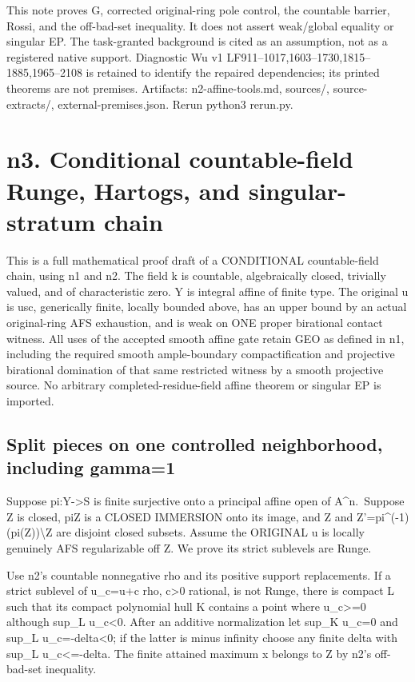 \documentclass[
  10pt,
]{article}
\begin{document}
This note proves G, corrected original-ring pole control, the countable
barrier, Rossi, and the off-bad-set inequality. It does not assert
weak/global equality or singular EP. The task-granted background is
cited as an assumption, not as a registered native support. Diagnostic
Wu v1 LF911--1017,1603--1730,1815--1885,1965--2108 is retained to
identify the repaired dependencies; its printed theorems are not
premises. Artifacts: n2-affine-tools.md, sources/, source-extracts/,
external-premises.json. Rerun python3 rerun.py.

\section{n3. Conditional countable-field Runge, Hartogs, and
singular-stratum
chain}\label{n3.-conditional-countable-field-runge-hartogs-and-singular-stratum-chain}

This is a full mathematical proof draft of a CONDITIONAL countable-field
chain, using n1 and n2. The field k is countable, algebraically closed,
trivially valued, and of characteristic zero. Y is integral affine of
finite type. The original u is usc, generically finite, locally bounded
above, has an upper bound by an actual original-ring AFS exhaustion, and
is weak on ONE proper birational contact witness. All uses of the
accepted smooth affine gate retain GEO as defined in n1, including the
required smooth ample-boundary compactification and projective
birational domination of that same restricted witness by a smooth
projective source. No arbitrary completed-residue-field affine theorem
or singular EP is imported.

\subsection{Split pieces on one controlled neighborhood, including
gamma=1}\label{split-pieces-on-one-controlled-neighborhood-including-gamma1}

Suppose pi:Y-\textgreater S is finite surjective onto a principal affine
open of A\^{}n.~Suppose Z is closed, pi\textbar Z is a CLOSED IMMERSION
onto its image, and Z and Z'=pi\^{}(-1)(pi(Z))\textbackslash Z are
disjoint closed subsets. Assume the ORIGINAL u is locally genuinely AFS
regularizable off Z. We prove its strict sublevels are Runge.

Use n2's countable nonnegative rho and its positive support
replacements. If a strict sublevel of u\_c=u+c rho, c\textgreater0
rational, is not Runge, there is compact L such that its compact
polynomial hull K contains a point where u\_c\textgreater=0 although
sup\_L u\_c\textless0. After an additive normalization let sup\_K u\_c=0
and sup\_L u\_c=-delta\textless0; if the latter is minus infinity choose
any finite delta with sup\_L u\_c\textless=-delta. The finite attained
maximum x belongs to Z by n2's off-bad-set inequality.
\end{document}

